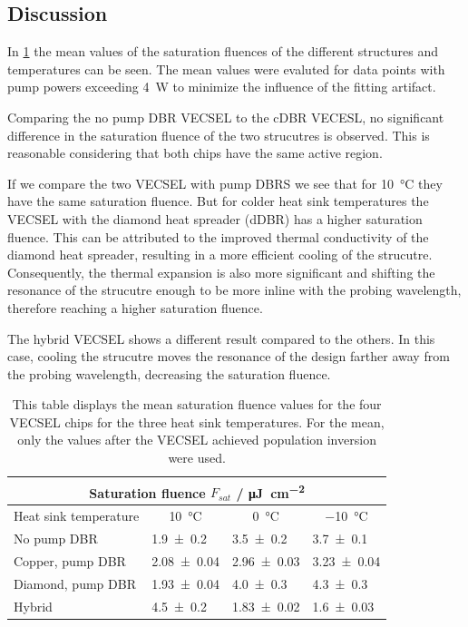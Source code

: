 \subsection*{Discussion}
In \cref{tab:fsat} the mean values of the saturation fluences of the different structures and temperatures can be seen. The mean values were evaluted for data points with pump powers exceeding \qty{4}{\W} to minimize the influence of the fitting artifact.

Comparing the no pump DBR VECSEL to the cDBR VECESL, no significant difference in the saturation fluence of the two strucutres is observed. This is reasonable considering that both chips have the same active region.

If we compare the two VECSEL with pump DBRS we see that for \qty{10}{\celsius} they have the same saturation fluence. But for colder heat sink temperatures the VECSEL with the diamond heat spreader (dDBR) has a higher saturation fluence. This can be attributed to the improved thermal conductivity of the diamond heat spreader, resulting in a more efficient cooling of the strucutre. Consequently, the thermal expansion is also more significant and shifting the resonance of the strucutre enough to be more inline with the probing wavelength, therefore reaching a higher saturation fluence.

The hybrid VECSEL shows a different result compared to the others. In this case, cooling the strucutre moves the resonance of the design farther away from the probing wavelength, decreasing the saturation fluence.
\begin{table}[ht]
    \centering
    \begin{tabular}{llll}
        \multicolumn{4}{c}{Saturation fluence $F_{sat}$ / \unit{\micro\J\per\cm\squared}}                  \\ \hline
        Heat sink temperature                  &
        \multicolumn{1}{c}{\qty{10}{\celsius}} &
        \multicolumn{1}{c}{\qty{0}{\celsius}}  &
        \multicolumn{1}{c}{\qty{-10}{\celsius}}                                                            \\ \hline
        No pump DBR                            & \num{1.9\pm0.2}   & \num{3.5\pm0.2}   & \num{3.7\pm0.1}   \\ \hline
        Copper, pump DBR                       & \num{2.08\pm0.04} & \num{2.96\pm0.03} & \num{3.23\pm0.04} \\ \hline
        Diamond, pump DBR                      & \num{1.93\pm0.04} & \num{4.0\pm0.3}   & \num{4.3\pm0.3}   \\ \hline
        Hybrid                                 & \num{4.5\pm0.2}   & \num{1.83\pm0.02} & \num{1.6\pm0.03}
    \end{tabular}
    \caption{This table displays the mean saturation fluence values for the four VECSEL chips for the three heat sink temperatures. For the mean, only the values after the VECSEL achieved population inversion were used.}
    \label{tab:fsat}
\end{table}

